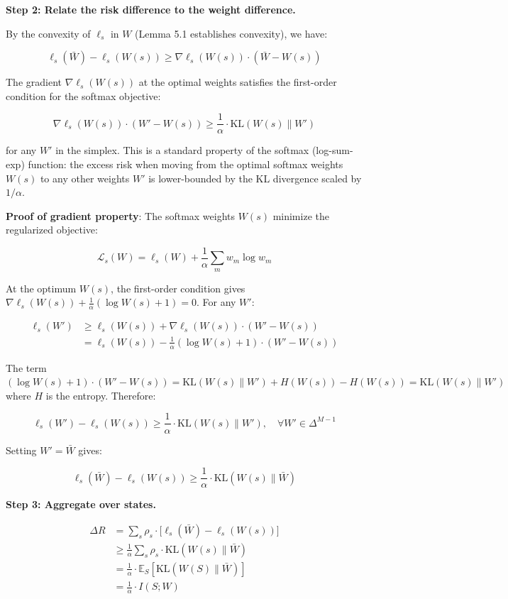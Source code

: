 \documentclass[
  12pt,
]{ctexart}
\begin{document}
\textbf{Step 2: Relate the risk difference to the weight difference.}

By the convexity of \(\ell_s\) in \(W\) (Lemma 5.1 establishes
convexity), we have:

\[\ell_s(\bar{W}) - \ell_s(W(s)) \geq \nabla \ell_s(W(s)) \cdot (\bar{W} - W(s))\]

The gradient \(\nabla \ell_s(W(s))\) at the optimal weights satisfies
the first-order condition for the softmax objective:

\[\nabla \ell_s(W(s)) \cdot (W' - W(s)) \geq \frac{1}{\alpha} \cdot \text{KL}(W(s) \parallel W')\]

for any \(W'\) in the simplex. This is a standard property of the
softmax (log-sum-exp) function: the excess risk when moving from the
optimal softmax weights \(W(s)\) to any other weights \(W'\) is
lower-bounded by the KL divergence scaled by \(1/\alpha\).

\textbf{Proof of gradient property}: The softmax weights \(W(s)\)
minimize the regularized objective:

\[\mathcal{L}_s(W) = \ell_s(W) + \frac{1}{\alpha} \sum_m w_m \log w_m\]

At the optimum \(W(s)\), the first-order condition gives
\(\nabla \ell_s(W(s)) + \frac{1}{\alpha}(\log W(s) + 1) = 0\). For any
\(W'\):

\[\begin{aligned}
\ell_s(W') &\geq \ell_s(W(s)) + \nabla \ell_s(W(s)) \cdot (W' - W(s)) \\
&= \ell_s(W(s)) - \frac{1}{\alpha} (\log W(s) + 1) \cdot (W' - W(s))
\end{aligned}\]

The term
\((\log W(s) + 1) \cdot (W' - W(s)) = \text{KL}(W(s) \parallel W') + H(W(s)) - H(W(s)) = \text{KL}(W(s) \parallel W')\)
where \(H\) is the entropy. Therefore:

\[\ell_s(W') - \ell_s(W(s)) \geq \frac{1}{\alpha} \cdot \text{KL}(W(s) \parallel W'), \quad \forall W' \in \Delta^{M-1}\]

Setting \(W' = \bar{W}\) gives:

\[\ell_s(\bar{W}) - \ell_s(W(s)) \geq \frac{1}{\alpha} \cdot \text{KL}(W(s) \parallel \bar{W})\]

\textbf{Step 3: Aggregate over states.}

\[\begin{aligned}
\Delta R &= \sum_s \rho_s \cdot \bigl[ \ell_s(\bar{W}) - \ell_s(W(s)) \bigr] \\
&\geq \frac{1}{\alpha} \sum_s \rho_s \cdot \text{KL}(W(s) \parallel \bar{W}) \\
&= \frac{1}{\alpha} \cdot \mathbb{E}_S[\text{KL}(W(S) \parallel \bar{W})] \\
&= \frac{1}{\alpha} \cdot I(S; W)
\end{aligned}\]
\end{document}
